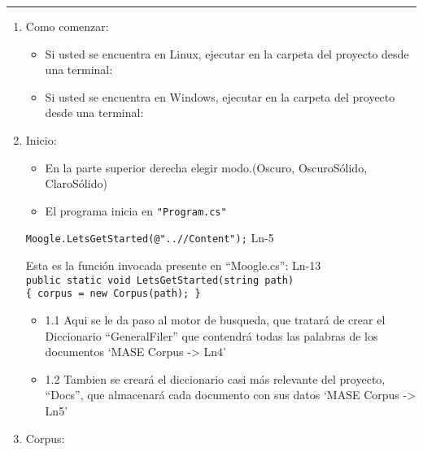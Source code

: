 \begin{center}\rule{0.5\linewidth}{0.5pt}\end{center}

\begin{enumerate}
\def\labelenumi{\arabic{enumi}.}
\setcounter{enumi}{-1}
\item
  Como comenzar:

  \begin{itemize}
  \item
    Si usted se encuentra en Linux, ejecutar en la carpeta del proyecto
    desde una terminal:

\begin{Shaded}
\begin{Highlighting}[]
\end{Highlighting}
\end{Shaded}
  \item
    Si usted se encuentra en Windows, ejecutar en la carpeta del
    proyecto desde una terminal:

\begin{Shaded}
\begin{Highlighting}[]
\end{Highlighting}
\end{Shaded}
  \end{itemize}
\item
  Inicio:

  \begin{itemize}
  \tightlist
  \item
    En la parte superior derecha elegir modo.(Oscuro, OscuroSólido,
    ClaroSólido)
  \item
    El programa inicia en \texttt{"Program.cs"}
  \end{itemize}

  \texttt{Moogle.LetsGetStarted(@"..//Content");} Ln-5

  Esta es la función invocada presente en ``Moogle.cs'': Ln-13
  \texttt{public\ static\ void\ LetsGetStarted(string\ path)\{\ corpus\ =\ new\ Corpus(path);\ \}}

  \begin{itemize}
  \tightlist
  \item
    1.1 Aqui se le da paso al motor de busqueda, que tratará de crear el
    Diccionario ``GeneralFiler'' que contendrá todas las palabras de los
    documentos `MASE Corpus -\textgreater{} Ln4'
  \item
    1.2 Tambien se creará el diccionario casi más relevante del
    proyecto, ``Docs'', que almacenará cada documento con sus datos
    `MASE Corpus -\textgreater{} Ln5'
  \end{itemize}
\item
  Corpus:


\end{enumerate}
